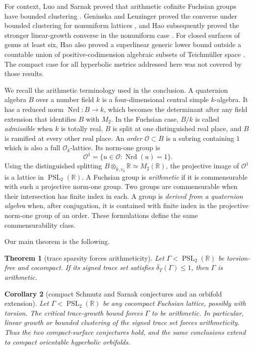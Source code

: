 \documentclass[11pt,reqno]{amsart}
\newtheorem{theorem}{Theorem}[section]
\newtheorem{corollary}[theorem]{Corollary}
\theoremstyle{definition}
\theoremstyle{remark}
\newcommand{\R}{\mathbb R}
\newcommand{\cO}{\mathcal O}
\newcommand{\PSL}{\operatorname{PSL}}
\begin{document}
For context, Luo and Sarnak proved that arithmetic cofinite Fuchsian groups
have bounded clustering \cite{LuoSarnak}.  Geninska and Leuzinger proved
the converse under bounded clustering for nonuniform lattices
\cite{GeninskaLeuzinger}, and Hao subsequently proved the stronger
linear-growth converse in the nonuniform case \cite{HaoTraceSets}.  For
closed surfaces of genus at least six, Hao also proved a superlinear
generic lower bound outside a countable union of positive-codimension
algebraic subsets of Teichm\"uller space \cite{HaoLengthSets}.  The compact
case for all hyperbolic metrics addressed here was not covered by those
results.

We recall the arithmetic terminology used in the conclusion.  A quaternion
algebra \(B\) over a number field \(k\) is a four-dimensional central simple
\(k\)-algebra.  It has a reduced norm
\(\operatorname{Nrd}:B\to k\), which becomes the determinant after any
field extension that identifies \(B\) with \(M_2\).  In the Fuchsian case,
\(B/k\) is called \emph{admissible} when \(k\) is totally real, \(B\) is
split at one distinguished real place, and \(B\) is ramified at every other
real place.  An \emph{order} \(\mathcal O\subset B\) is a subring containing
\(1\) which is also a full \(\cO_k\)-lattice.  Its norm-one group is
\[
 \mathcal O^1=\{u\in\mathcal O:\operatorname{Nrd}(u)=1\}.
\]
Using the distinguished splitting \(B\otimes_{k,v_0}\R\simeq M_2(\R)\),
the projective image of \(\mathcal O^1\) is a lattice in
\(\PSL_2(\R)\).  A Fuchsian group is \emph{arithmetic} if it is
commensurable with such a projective norm-one group.  Two groups are
commensurable when their intersection has finite index in each.  A group is
\emph{derived from a quaternion algebra} when, after conjugation, it is
contained with finite index in the projective norm-one group of an order.
These formulations define the same commensurability class.

Our main theorem is the following.

\begin{theorem}[trace sparsity forces arithmeticity]
\label{thm:main-arithmeticity}
Let \(\Gamma<\PSL_2(\R)\) be torsion-free and cocompact.  If its signed
trace set satisfies \(\overline\delta_T(\Gamma)\le1\), then \(\Gamma\) is
arithmetic.
\end{theorem}

\begin{corollary}[compact Schmutz and Sarnak conjectures and an orbifold extension]
\label{cor:schmutz-sarnak}
Let \(\Gamma<\PSL_2(\R)\) be any cocompact Fuchsian lattice, possibly with
torsion.  The critical trace-growth bound forces \(\Gamma\) to be arithmetic.
In particular, linear growth or bounded clustering of the signed trace set
forces arithmeticity.  Thus the two compact-surface conjectures hold, and
the same conclusions extend to compact orientable hyperbolic orbifolds.
\end{corollary}
\end{document}
